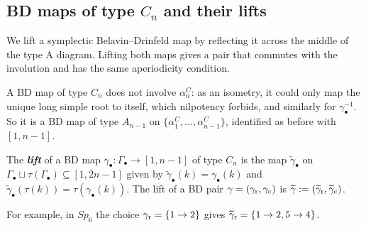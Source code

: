 \documentclass[a4paper]{amsart}
\numberwithin{equation}{section}
\theoremstyle{definition}
\theoremstyle{remark}
\newcommand{\tg}{\widetilde{\gamma}}
\newcommand{\rr}{{\rm r}}
\newcommand{\cc}{{\rm c}}
\newcommand{\newword}[1]{\textbf{\emph{#1}}}
\begin{document}
\subsection{BD maps of type \texorpdfstring{$C_n$}{Cn} and their lifts}
We lift a symplectic Belavin--Drinfeld map by reflecting it across the middle of the type A diagram.
Lifting both maps gives a pair that commutes with the involution and has the same aperiodicity condition.

A BD map of type $C_n$ does not involve $\alpha^C_n$: as an isometry, it could only map the unique long simple root to itself, which nilpotency forbids, and similarly for $\gamma_\bullet^{-1}$.
So it is a BD map of type $A_{n-1}$ on $\{\alpha^C_1,\dots,\alpha^C_{n-1}\}$, identified as before with $[1,n-1]$.

\begin{definition}
  \label{def: lift}
  The \newword{lift} of a BD map $\gamma_\bullet:\Gamma_\bullet\to[1,n-1]$ of type $C_n$ is the map $\tg_\bullet$ on $\Gamma_\bullet\sqcup\tau(\Gamma_\bullet)\subseteq[1,2n-1]$ given by $\tg_\bullet(k)=\gamma_\bullet(k)$ and $\tg_\bullet(\tau(k))=\tau(\gamma_\bullet(k))$.
  The lift of a BD pair $\gamma=(\gamma_{\rr},\gamma_{\cc})$ is $\tg:=(\tg_{\rr},\tg_{\cc})$.
\end{definition}

For example, in $Sp_6$ the choice $\gamma_{\rr}=\{1\to2\}$ gives $\tg_{\rr}=\{1\to2,5\to4\}$.
\end{document}

